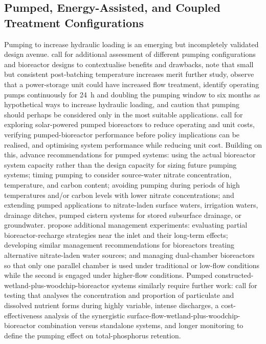 \subsection{Pumped, Energy-Assisted, and Coupled Treatment Configurations}
Pumping to increase hydraulic loading is an emerging but incompletely validated design avenue. \textcite{DíazGarcía2025} call for additional assessment of different pumping configurations and bioreactor designs to contextualise benefits and drawbacks, note that small but consistent post-batching temperature increases merit further study, observe that a power-storage unit could have increased flow treatment, identify operating pumps continuously for 24~h and doubling the pumping window to six months as hypothetical ways to increase hydraulic loading, and caution that pumping should perhaps be considered only in the most suitable applications. \textcite{Hartfiel2024} call for exploring solar-powered pumped bioreactors to reduce operating and unit costs, verifying pumped-bioreactor performance before policy implications can be realised, and optimising system performance while reducing unit cost. Building on this, \textcite{Hartfiel2023} advance recommendations for pumped systems: using the actual bioreactor system capacity rather than the design capacity for sizing future pumping systems; timing pumping to consider source-water nitrate concentration, temperature, and carbon content; avoiding pumping during periods of high temperatures and/or carbon levels with lower nitrate concentrations; and extending pumped applications to nitrate-laden surface waters, irrigation waters, drainage ditches, pumped cistern systems for stored subsurface drainage, or groundwater. \textcite{Hartfiel2023b} propose additional management experiments: evaluating partial bioreactor-recharge strategies near the inlet and their long-term effects; developing similar management recommendations for bioreactors treating alternative nitrate-laden water sources; and managing dual-chamber bioreactors so that only one parallel chamber is used under traditional or low-flow conditions while the second is engaged under higher-flow conditions. Pumped constructed-wetland-plus-woodchip-bioreactor systems similarly require further work: \textcite{Pugliese2020} call for testing that analyses the concentration and proportion of particulate and dissolved nutrient forms during highly variable, intense discharges, a cost-effectiveness analysis of the synergistic surface-flow-wetland-plus-woodchip-bioreactor combination versus standalone systems, and longer monitoring to define the pumping effect on total-phosphorus retention.


